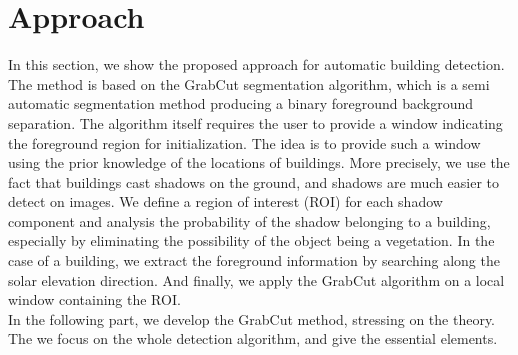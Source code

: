 \documentclass[runningheads]{llncs}
\begin{document}
\section{Approach}
In this section, we show the proposed approach for automatic building detection. The method is based on the GrabCut segmentation algorithm, which is a semi automatic segmentation method producing a binary foreground background separation. The algorithm itself requires the user to provide a window indicating the foreground region for initialization. The idea is to provide such a window using the prior knowledge of the locations of buildings. More precisely, we use the fact that buildings cast shadows on the ground, and shadows are much easier to detect on images. We define a region of interest (ROI) for each shadow component and analysis the probability of the shadow belonging to a building, especially by eliminating the possibility of the object being a vegetation. In the case of a building, we extract the foreground information by searching along the solar elevation direction. And finally, we apply the GrabCut algorithm on a local window containing the ROI.\\
In the following part, we develop the GrabCut method, stressing on the theory. The we focus on the whole detection algorithm, and give the essential elements.
\end{document}
